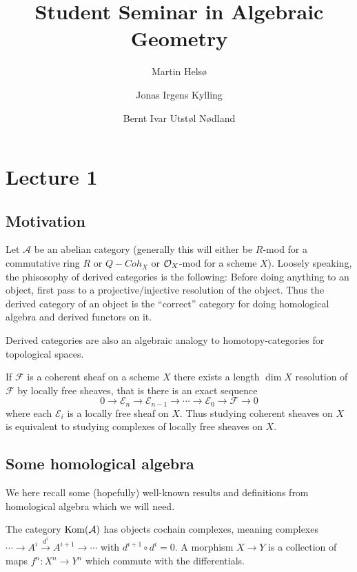 \documentclass[a4paper, UKenglish]{report}
\title
{
    \bfseries\sffamily
    Student Seminar in Algebraic Geometry
}
\author
{
    Martin Hels\o
    \and
    Jonas Irgens Kylling
    \and
    Bernt Ivar Utst\o l N\o dland
}
\begin{document}
\begin{titlepage}
    \maketitle
\end{titlepage}

\chapter{Lecture 1}

\section{Motivation}

Let $\mathcal{A}$ be an abelian category (generally this will either be $R$-mod for a commutative ring $R$ or $Q-Coh_X$ or $\mathcal{O}_X$-mod for a scheme $X$). Loosely speaking, the phisosophy of derived categories is the following: Before doing anything to an object, first pass to a projective/injective resolution of the object. Thus the derived category of an object is the ``correct'' category for doing homological algebra and derived functors on it.

Derived categories are also an algebraic analogy to homotopy-categories for topological spaces.

\begin{example}
If $\mathcal{F}$ is a coherent sheaf on a scheme $X$ there exists a length $\dim X$ resolution of $\mathcal{F}$ by locally free sheaves, that is there is an exact sequence
\[ 0 \to \mathcal{E}_n \to \mathcal{E}_{n-1} \to \cdots \to \mathcal{E}_0 \to \mathcal{F} \to 0 \]
where each $\mathcal{E}_i$ is a locally free sheaf on $X$. Thus studying coherent sheaves on $X$ is equivalent to studying complexes of locally free sheaves on $X$.
\end{example}

\section{Some homological algebra}

We here recall some (hopefully) well-known results and definitions from homological algebra which we will need.

The category $\operatorname{Kom}(\mathcal{A})$ has objects cochain complexes, meaning complexes $ \cdots \to A^i \xrightarrow{d^i} A^{i+1} \to \cdots$  with $d^{i+1} \circ d^i = 0$. A morphism  $X \to Y$ is a collection of maps $f^n: X^n \to Y^n$ which commute with the differentials.
\end{document}
